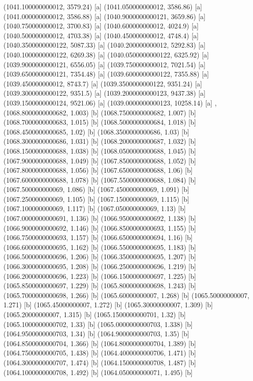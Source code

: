 {{{(1041.100000000012, 3579.24) [a] 
(1041.050000000012, 3586.86) [a] 
(1041.000000000012, 3586.88) [a] 
(1040.9000000000121, 3659.86) [a] 
(1040.750000000012, 3700.83) [a] 
(1040.600000000012, 4024.9) [a] 
(1040.500000000012, 4703.38) [a] 
(1040.450000000012, 4748.4) [a] 
(1040.3500000000122, 5087.33) [a] 
(1040.200000000012, 5292.83) [a] 
(1040.1000000000122, 6269.38) [a] 
(1040.0500000000122, 6325.92) [a] 
(1039.9000000000121, 6556.05) [a] 
(1039.750000000012, 7021.54) [a] 
(1039.6500000000121, 7354.48) [a] 
(1039.6000000000122, 7355.88) [a] 
(1039.450000000012, 8743.7) [a] 
(1039.3500000000122, 9351.24) [a] 
(1039.3000000000122, 9351.5) [a] 
(1039.2000000000123, 9437.38) [a] 
(1039.1500000000124, 9521.06) [a] 
(1039.0000000000123, 10258.14) [a] 
},{
(1068.8000000000682, 1.003) [b] 
(1068.7500000000682, 1.007) [b] 
(1068.7000000000683, 1.015) [b] 
(1068.5000000000684, 1.018) [b] 
(1068.4500000000685, 1.02) [b] 
(1068.3500000000686, 1.03) [b] 
(1068.3000000000686, 1.031) [b] 
(1068.2000000000687, 1.032) [b] 
(1068.1500000000688, 1.038) [b] 
(1068.0500000000688, 1.045) [b] 
(1067.9000000000688, 1.049) [b] 
(1067.8500000000688, 1.052) [b] 
(1067.8000000000688, 1.056) [b] 
(1067.6500000000688, 1.06) [b] 
(1067.6000000000688, 1.078) [b] 
(1067.5500000000688, 1.084) [b] 
(1067.500000000069, 1.086) [b] 
(1067.450000000069, 1.091) [b] 
(1067.250000000069, 1.105) [b] 
(1067.150000000069, 1.115) [b] 
(1067.100000000069, 1.117) [b] 
(1067.050000000069, 1.13) [b] 
(1067.0000000000691, 1.136) [b] 
(1066.9500000000692, 1.138) [b] 
(1066.9000000000692, 1.146) [b] 
(1066.8500000000693, 1.155) [b] 
(1066.7500000000693, 1.157) [b] 
(1066.6500000000694, 1.16) [b] 
(1066.6000000000695, 1.162) [b] 
(1066.5500000000695, 1.183) [b] 
(1066.5000000000696, 1.206) [b] 
(1066.3500000000695, 1.207) [b] 
(1066.3000000000695, 1.208) [b] 
(1066.2500000000696, 1.219) [b] 
(1066.2000000000696, 1.223) [b] 
(1066.1500000000697, 1.225) [b] 
(1065.8500000000697, 1.229) [b] 
(1065.8000000000698, 1.243) [b] 
(1065.7000000000698, 1.266) [b] 
(1065.60000000007, 1.268) [b] 
(1065.50000000007, 1.271) [b] 
(1065.45000000007, 1.272) [b] 
(1065.30000000007, 1.309) [b] 
(1065.20000000007, 1.315) [b] 
(1065.1500000000701, 1.32) [b] 
(1065.1000000000702, 1.33) [b] 
(1065.0000000000703, 1.338) [b] 
(1064.9500000000703, 1.34) [b] 
(1064.9000000000703, 1.35) [b] 
(1064.8500000000704, 1.366) [b] 
(1064.8000000000704, 1.389) [b] 
(1064.7500000000705, 1.438) [b] 
(1064.4000000000706, 1.471) [b] 
(1064.3000000000707, 1.474) [b] 
(1064.1500000000708, 1.487) [b] 
(1064.1000000000708, 1.492) [b] 
(1064.050000000071, 1.495) [b] 
}}}
